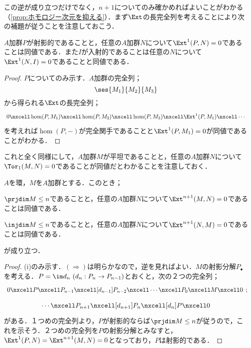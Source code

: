 この逆が成り立つだけでなく，$n+1$についてのみ確かめればよいことがわかる（\ref{prop:ホモロジー次元を抑える}）．まず$\Ext$の長完全列を考えることにより次の補題が従うことを注意しておこう．

\begin{lem}
	$A$加群$P$が射影的であることと，任意の$A$加群$N$について$\Ext^1(P,N)=0$であることは同値である．また$I$が入射的であることは任意の$N$について$\Ext^1(N,I)=0$であることと同値である．
\end{lem}

\begin{proof}
	$P$についてのみ示す．$A$加群の完全列；
	\[\ses{M_1}{M_2}{M_3}\]
	から得られる$\Ext$の長完全列；
	\[\begin{tikzcd}
	0\nxcell\hom(P,M_1)\nxcell\hom(P,M_2)\nxcell\hom(P,M_3)\nxcell\Ext^1(P,M_1)\nxcell\cdots
	\end{tikzcd}\]
	を考えれば$\hom(P,-)$が完全関手であることと$\Ext^1(P,M_1)=0$が同値であることがわかる．
\end{proof}

これと全く同様にして，$A$加群$M$が平坦であることと，任意の$A$加群$N$について$\Tor_1(M,N)=0$であることが同値だとわかることを注意しておく．

\begin{prop}\label{prop:ホモロジー次元を抑える}
	$A$を環，$M$を$A$加群とする．このとき；
	\begin{sakura}
	\item $\prjdim M\leq n$であることと，任意の$A$加群$N$について$\Ext^{n+1}(M,N)=0$であることは同値である．
	\item $\injdim M\leq n$であることと，任意の$A$加群$N$について$\Ext^{n+1}(N,M)=0$であることは同値である．
\end{sakura}
が成り立つ．
\end{prop}

\begin{proof}
	(i)のみ示す．$(\Longrightarrow)$は明らかなので，逆を見ればよい．$M$の射影分解$P_\bullet$を考える．$P=\im d_n~(d_n:P_n\to P_{n-1})$とおくと，次の２つの完全列；
	\[\begin{tikzcd}
	0\nxcell P\nxcell P_{n-1}\nxcell[d_{n-1}]P_{n-2}\nxcell\cdots\nxcell P_0\nxcell M\nxcell0\end{tikzcd};\]
	\[\begin{tikzcd}
	\cdots\nxcell P_{n+1}\nxcell[d_{n+1}]P_n\nxcell[d_n]P\nxcell0
	\end{tikzcd}\]
	がある．１つめの完全列より，$P$が射影的ならば$\prjdim M\leq n$が従うので，これを示そう．２つめの完全列を$P$の射影分解とみなすと，$\Ext^1(P,N)=\Ext^{n+1}(M,N)=0$となっており，$P$は射影的である．
\end{proof}

